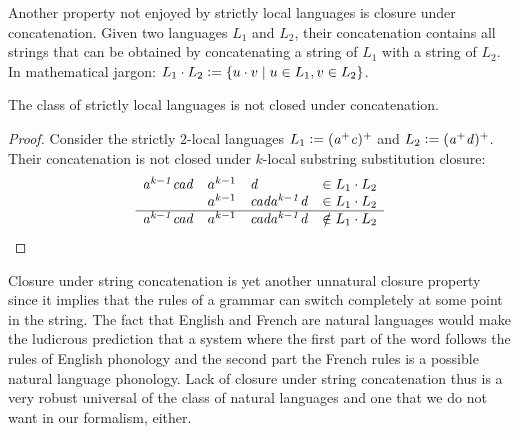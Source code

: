 Another property not enjoyed by strictly local languages is closure under concatenation.
Given two languages $L_1$ and $L_2$, their concatenation contains all strings that can be obtained by concatenating a string of $L_1$ with a string of $L_2$.
In mathematical jargon: $L_1 \cdot L_2 \mathrel{\mathop:}= \left \{  u \cdot v \mid u \in L_1, v \in L_2 \right \}$.
%
\begin{lemma}
    The class of strictly local languages is not closed under concatenation.
\end{lemma}
%
\begin{proof}
    Consider the strictly $2$-local languages $L_1 \mathrel{\mathop:}= \mathit{(a^+ c)^+}$ and $L_2 \mathrel{\mathop:}= \mathit{(a^+ d)^+}$.
    Their concatenation is not closed under $k$-local substring substitution closure:
    \[
        \begin{array}{rcll}
            \mathit{a^{k-1}cad} & a^{k-1} & \mathit{d}    & \in L_1 \cdot L_2\\
                          & a^{k-1} & \mathit{cada^{k-1}d} & \in L_1 \cdot L_2\\\hline
            \mathit{a^{k-1}cad} & a^{k-1} & \mathit{cada^{k-1}d} & \notin L_1 \cdot L_2
        \end{array}
    \]
\end{proof}
%
Closure under string concatenation is yet another unnatural closure property since it implies that the rules of a grammar can switch completely at some point in the string.
The fact that English and French are natural languages would make the ludicrous prediction that a system where the first part of the word follows the rules of English phonology and the second part the French rules is a possible natural language phonology.
Lack of closure under string concatenation thus is a very robust universal of the class of natural languages and one that we do not want in our formalism, either.

